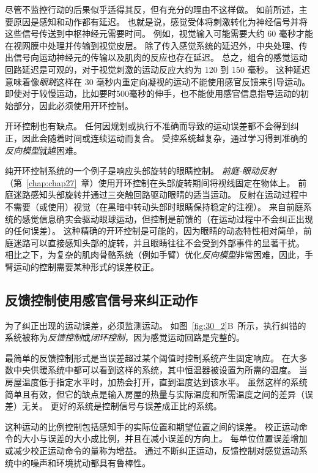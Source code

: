 尽管不监控行动的后果似乎适得其反，但有充分的理由不这样做。
如前所述，主要原因是感知和动作都有延迟。
也就是说，感觉受体将刺激转化为神经信号并将这些信号传送到中枢神经元需要时间。
例如，视觉输入可能需要大约 60 毫秒才能在视网膜中处理并传输到视觉皮层。
除了传入感觉系统的延迟外，中央处理、传出信号向运动神经元的传输以及肌肉的反应也存在延迟。
总之，组合的感觉运动回路延迟是可观的，对于视觉刺激的运动反应大约为 120 到 150 毫秒。
这种延迟意味着像\textit{眼跳}这样在 30 毫秒内重定向凝视的运动不能使用感官反馈来引导运动。
即使对于较慢运动，比如要时500毫秒的伸手，也不能使用感官信息指导运动的初始部分，因此必须使用开环控制。


开环控制也有缺点。
任何因规划或执行不准确而导致的运动误差都不会得到纠正，因此会随着时间或连续运动而复合。
受控系统越复杂，通过学习得到准确的\textit{反向模型}就越困难。


纯开环控制系统的一个例子是响应头部旋转的眼睛控制。
\textit{前庭-眼动反射}（第~\ref{chap:chap27}~章）使用开环控制在头部旋转期间将视线固定在物体上。
前庭迷路感知头部旋转并通过三突触回路驱动眼睛的适当运动。
反射在运动过程中不需要（或使用）视觉（在黑暗中转动头部时眼睛保持稳定的注视）。
来自前庭系统的感觉信息确实会驱动眼球运动，但控制是前馈的（在运动过程中不会纠正出现的任何误差）。
这种精确的开环控制是可能的，因为眼睛的动态特性相对简单，前庭迷路可以直接感知头部的旋转，并且眼睛往往不会受到外部事件的显著干扰。
相比之下，为复杂的肌肉骨骼系统（例如手臂）优化\textit{反向模型}非常困难，因此，手臂运动的控制需要某种形式的误差校正。



\subsection{反馈控制使用感官信号来纠正动作}

为了纠正出现的运动误差，必须监测运动。
如图~\ref{fig:30_2}B~所示，执行纠错的系统被称为\textit{反馈控制}或\textit{闭环控制}，因为感觉运动回路是完整的。


最简单的反馈控制形式是当误差超过某个阈值时控制系统产生固定响应。
在大多数中央供暖系统中都可以看到这样的系统，其中恒温器被设置为所需的温度。
当房屋温度低于指定水平时，加热会打开，直到温度达到该水平。
虽然这样的系统简单且有效，但它的缺点是输入房屋的热量与实际温度和所需温度之间的差异（误差）无关。
更好的系统是控制信号与误差成正比的系统。


这种运动的比例控制包括感知手的实际位置和期望位置之间的误差。
校正运动命令的大小与误差的大小成比例，并且在减小误差的方向上。
每单位位置误差增加或减少校正运动命令的量称为增益。
通过不断纠正运动，反馈控制对感觉运动系统中的噪声和环境扰动都具有鲁棒性。


